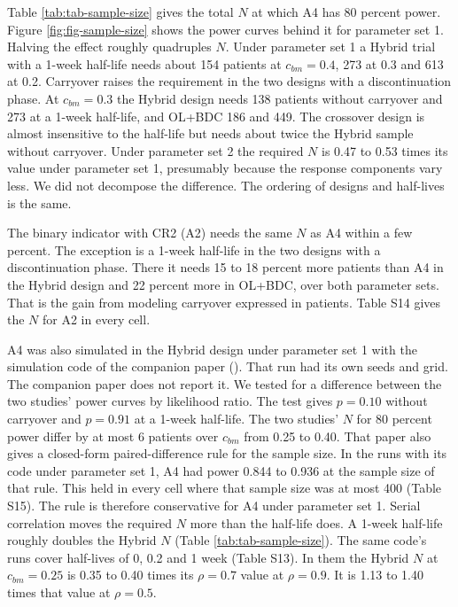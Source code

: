 \documentclass[
  11pt,
]{article}
\begin{document}
Table \ref{tab:tab-sample-size} gives the total \(N\) at which A4 has 80
percent power. Figure \ref{fig:fig-sample-size} shows the power
curves behind it for parameter set 1. Halving the effect roughly
quadruples \(N\). Under parameter set 1 a Hybrid trial with a 1-week
half-life needs about
154 patients at
\(c_{bm} = 0.4\), 273 at
0.3 and 613 at 0.2.
Carryover raises the requirement in the two designs with a
discontinuation phase. At \(c_{bm} = 0.3\) the Hybrid design needs
138 patients without
carryover and 273 at a
1-week half-life, and OL+BDC
186 and
449. The crossover design
is almost insensitive to the half-life but needs about twice the
Hybrid sample without carryover. Under parameter set 2 the required
\(N\) is
0.47 to 0.53
times its value under parameter set 1, presumably because the response
components vary less.
We did not decompose the difference. The ordering of designs and
half-lives is the same.

The binary indicator with CR2 (A2) needs the same \(N\) as A4 within a
few percent. The exception is a 1-week half-life in the two designs
with a discontinuation phase. There it needs 15 to 18
percent more patients than A4 in the Hybrid design and
22 percent more in OL+BDC, over both parameter sets.
That is the gain from modeling carryover expressed in patients. Table
S14 gives the \(N\) for A2 in
every cell.

A4 was also simulated in the Hybrid design under parameter set 1
with the simulation code of the companion paper
(). That run had its own seeds and
grid. The companion paper does not report it. We tested for a
difference between the two studies' power curves by likelihood ratio.
The test gives
\(p = 0.10\) without
carryover and
\(p = 0.91\) at a
1-week half-life. The two studies' \(N\) for 80 percent power differ by
at most
6
patients over \(c_{bm}\) from 0.25 to 0.40. That paper also gives a
closed-form paired-difference rule for the sample size. In the runs
with its code under parameter set 1, A4 had power
0.844 to 0.936 at the sample
size of that rule. This held in every cell where that sample size was
at most 400 (Table S15). The rule is therefore conservative for A4
under parameter set 1.
Serial correlation moves the required \(N\) more than the half-life
does. A 1-week half-life roughly doubles the Hybrid \(N\) (Table
\ref{tab:tab-sample-size}). The same code's runs cover half-lives of
0, 0.2 and 1 week (Table S13). In them the Hybrid \(N\) at
\(c_{bm} = 0.25\) is
0.35 to 0.40 times its
\(\rho = 0.7\) value at \(\rho = 0.9\). It is
1.13 to 1.40 times that
value at \(\rho = 0.5\).
\end{document}
